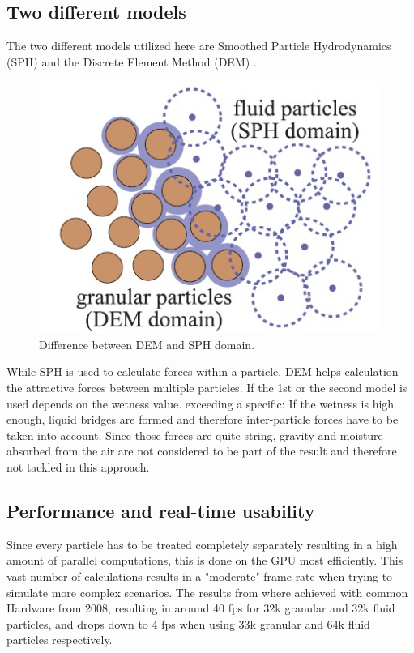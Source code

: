 \subsection{Two different models}
The two different models utilized here are Smoothed Particle Hydrodynamics (SPH) \cite{rungjiratananon2008real} and the Discrete Element Method (DEM) \cite{rungjiratananon2008real}.

\begin{figure}[htb]
	\centering
	\includegraphics[width=\linewidth]{RSKN08/domains.jpg}
	\caption{Difference between DEM and SPH domain.}
	\label{fig:domains}
\end{figure}

While SPH is used to calculate forces within a particle, DEM helps calculation the attractive forces between multiple particles. If the 1st or the second model is used depends on the wetness value. exceeding a specific: If the wetness is high enough, liquid bridges are formed and therefore inter-particle forces have to be taken into account. Since those forces are quite string, gravity and moisture absorbed from the air are not considered to be part of the result and therefore not tackled in this approach.

\subsection{Performance and real-time usability}
Since every particle has to be treated completely separately resulting in a high amount of parallel computations, this is done on the GPU most efficiently. This vast number of calculations results in a "moderate" frame rate when trying to simulate more complex scenarios. The results from \cite{rungjiratananon2008real} where achieved with common Hardware from 2008, resulting in around 40 fps for 32k granular and 32k fluid particles, and drops down to 4 fps when using 33k granular and 64k fluid particles respectively.

